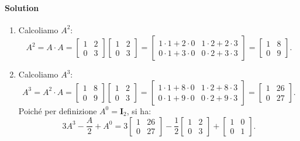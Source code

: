 \documentclass{article}
\theoremstyle{plain}
\theoremstyle{definition}
\theoremstyle{remark}
\begin{document}
\paragraph{Solution}
\begin{enumerate}
    \item Calcoliamo \(A^2\):
    \[
    A^2 = A\cdot A =
    \begin{bmatrix}
    1 & 2 \\
    0 & 3
    \end{bmatrix}
    \begin{bmatrix}
    1 & 2 \\
    0 & 3
    \end{bmatrix} =
    \begin{bmatrix}
    1\cdot1+2\cdot0 & 1\cdot2+2\cdot3 \\
    0\cdot1+3\cdot0 & 0\cdot2+3\cdot3
    \end{bmatrix} =
    \begin{bmatrix}
    1 & 8 \\
    0 & 9
    \end{bmatrix}.
    \]
    \item Calcoliamo \(A^3\):
    \[
    A^3 = A^2\cdot A =
    \begin{bmatrix}
    1 & 8 \\
    0 & 9
    \end{bmatrix}
    \begin{bmatrix}
    1 & 2 \\
    0 & 3
    \end{bmatrix} =
    \begin{bmatrix}
    1\cdot1+8\cdot0 & 1\cdot2+8\cdot3 \\
    0\cdot1+9\cdot0 & 0\cdot2+9\cdot3
    \end{bmatrix} =
    \begin{bmatrix}
    1 & 26 \\
    0 & 27
    \end{bmatrix}.
    \]
    Poiché per definizione \(A^0=\mathbf{I}_2\), si ha:
    \[
    3A^3-\dfrac{A}{2}+A^0 =
    3\begin{bmatrix}1&26\\0&27\end{bmatrix}
    -\dfrac{1}{2}\begin{bmatrix}1&2\\0&3\end{bmatrix}
    +\begin{bmatrix}1&0\\0&1\end{bmatrix}.
\]
\end{enumerate}
\end{document}
